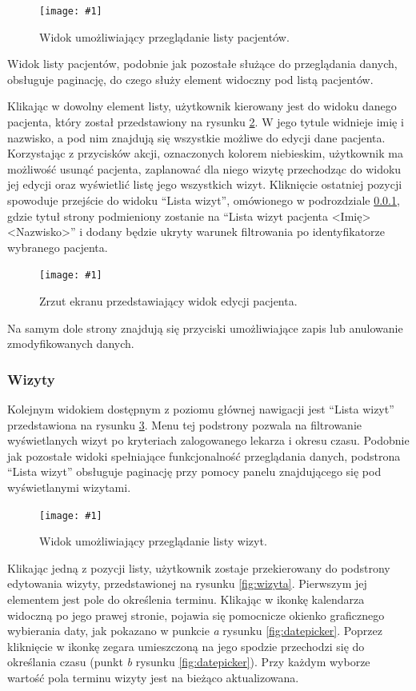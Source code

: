 \documentclass[11pt]{aghdpl}
\newcommand{\fullWidthPicture}[2]{
\begin{figure}[h!]
	\centering
		\texttt{[image: \#1]}
	\caption{#2}
	\label{fig:#1}
\end{figure}
}
\begin{document}
\fullWidthPicture{pacjenci}{Widok umożliwiający przeglądanie listy pacjentów.}

Widok listy pacjentów, podobnie jak pozostałe służące do przeglądania danych, obsługuje paginację, do czego służy element widoczny pod listą pacjentów.

Klikając w dowolny element listy, użytkownik kierowany jest do widoku danego pacjenta, który został przedstawiony na rysunku \ref{fig:pacjent}. W jego tytule widnieje imię i nazwisko, a pod nim znajdują się wszystkie możliwe do edycji dane pacjenta. Korzystając z przycisków akcji, oznaczonych kolorem niebieskim, użytkownik ma możliwość usunąć pacjenta, zaplanować dla niego wizytę przechodząc do widoku jej edycji oraz wyświetlić listę jego wszystkich wizyt. Kliknięcie ostatniej pozycji spowoduje przejście do widoku ``Lista wizyt'', omówionego w podrozdziale \ref{sec:wizyty}, gdzie tytuł strony podmieniony zostanie na ``Lista wizyt pacjenta <Imię> <Nazwisko>'' i dodany będzie ukryty warunek filtrowania po identyfikatorze wybranego pacjenta.

\fullWidthPicture{pacjent}{Zrzut ekranu przedstawiający widok edycji pacjenta.}

Na samym dole strony znajdują się przyciski umożliwiające zapis lub anulowanie zmodyfikowanych danych.

\subsubsection{Wizyty}
\label{sec:wizyty}

Kolejnym widokiem dostępnym z poziomu głównej nawigacji jest ``Lista wizyt'' przedstawiona na rysunku \ref{fig:wizyty}. Menu tej podstrony pozwala na filtrowanie wyświetlanych wizyt po kryteriach zalogowanego lekarza i okresu czasu. Podobnie jak pozostałe widoki spełniające funkcjonalność przeglądania danych, podstrona ``Lista wizyt'' obsługuje paginację przy pomocy panelu znajdującego się pod wyświetlanymi wizytami.

\fullWidthPicture{wizyty}{Widok umożliwiający przeglądanie listy wizyt.}

Klikając jedną z pozycji listy, użytkownik zostaje przekierowany do podstrony edytowania wizyty,   przedstawionej na rysunku \ref{fig:wizyta}. Pierwszym jej elementem jest pole do określenia terminu. Klikając w ikonkę kalendarza widoczną po jego prawej stronie, pojawia się pomocnicze okienko graficznego wybierania daty, jak pokazano w punkcie \emph{a} rysunku \ref{fig:datepicker}. Poprzez kliknięcie w ikonkę zegara umieszczoną na jego spodzie przechodzi się do określania czasu (punkt \emph{b} rysunku \ref{fig:datepicker}). Przy każdym wyborze wartość pola terminu wizyty jest na bieżąco aktualizowana.
\end{document}
